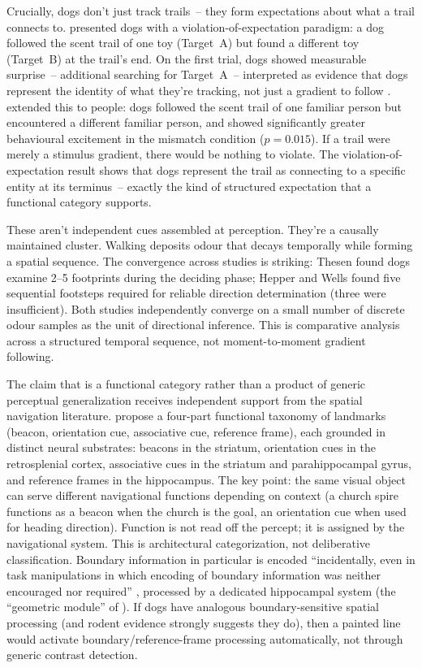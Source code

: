 \documentclass[12pt]{article}
\begin{document}
Crucially, dogs don't just track trails~-- they form expectations about what a trail connects to. \textcite{brauer2018} presented dogs with a violation-of-expectation paradigm: a dog followed the scent trail of one toy (Target~A) but found a different toy (Target~B) at the trail's end. On the first trial, dogs showed measurable surprise~-- additional searching for Target~A~-- interpreted as evidence that dogs represent the identity of what they're tracking, not just a gradient to follow \citep[194--195]{brauer2018}. \textcite{brauer2021} extended this to people: dogs followed the scent trail of one familiar person but encountered a different familiar person, and showed significantly greater behavioural excitement in the mismatch condition ($p = 0.015$). If a trail were merely a stimulus gradient, there would be nothing to violate. The violation-of-expectation result shows that dogs represent the trail as connecting to a specific entity at its terminus~-- exactly the kind of structured expectation that a functional category supports.

These aren't independent cues assembled at perception. They're a causally maintained cluster. Walking deposits odour that decays temporally while forming a spatial sequence. The convergence across studies is striking: Thesen found dogs examine 2--5 footprints during the deciding phase; Hepper and Wells found five sequential footsteps required for reliable direction determination (three were insufficient). Both studies independently converge on a small number of discrete odour samples as the unit of directional inference. This is comparative analysis across a structured temporal sequence, not moment-to-moment gradient following.

The claim that  is a functional category rather than a product of generic perceptual generalization receives independent support from the spatial navigation literature. \textcite{chan2012} propose a four-part functional taxonomy of landmarks (beacon, orientation cue, associative cue, reference frame), each grounded in distinct neural substrates: beacons in the striatum, orientation cues in the retrosplenial cortex, associative cues in the striatum and parahippocampal gyrus, and reference frames in the hippocampus. The key point: the same visual object can serve different navigational functions depending on context (a church spire functions as a beacon when the church is the goal, an orientation cue when used for heading direction). Function is not read off the percept; it is assigned by the navigational system. This is architectural categorization, not deliberative classification. Boundary information in particular is encoded \enquote{incidentally, even in task manipulations in which encoding of boundary information was neither encouraged nor required} \citep[7]{chan2012}, processed by a dedicated hippocampal system (the \enquote{geometric module} of \citealt{cheng1986}). If dogs have analogous boundary-sensitive spatial processing (and rodent evidence strongly suggests they do), then a painted line would activate boundary/reference-frame processing automatically, not through generic contrast detection.
\end{document}
